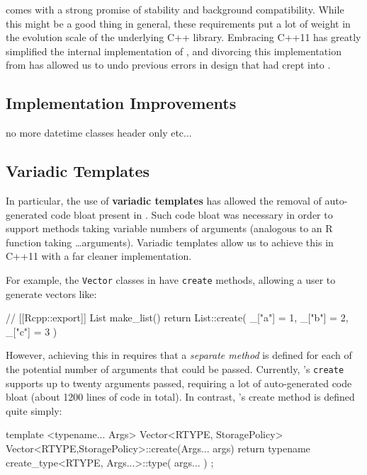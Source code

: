 comes with a strong promise of stability and
background compatibility. While this might be a good thing in general,
these requirements put a lot of weight in the evolution scale of the
underlying C++ library. Embracing C++11 has greatly simplified the internal
implementation of , and divorcing this implementation from
 has allowed us to undo previous errors in design that had crept into
.

\subsection{Implementation Improvements}

no more datetime classes
header only
etc...

\subsection{Variadic Templates}

In particular, the use of \textbf{variadic templates} has allowed the removal
of auto-generated code bloat present in . Such code bloat was
necessary in order to support methods taking variable numbers of arguments
(analogous to an R function taking \ldots arguments). Variadic templates allow
us to achieve this in C++11 with a far cleaner implementation.

For example, the \texttt{Vector} classes in  have \texttt{create}
methods, allowing a user to generate vectors like:

\begin{example}
// [[Rcpp::export]]
List make_list() {
  return List::create(
    _["a"] = 1,
    _["b"] = 2,
    _["c"] = 3
  )
}
\end{example}

However, achieving this in  requires that a \textit{separate method} is
defined for each of the potential number of arguments that could be passed. Currently,
's \texttt{create} supports up to twenty arguments passed,
requiring a lot of auto-generated code bloat (about 1200 lines of code in total).
In contrast, 's create method is defined quite simply:

\begin{example}
template <typename... Args>
Vector<RTYPE, StoragePolicy> Vector<RTYPE,StoragePolicy>::create(Args... args){
  return typename create_type<RTYPE, Args...>::type( args... ) ;
}
\end{example}

